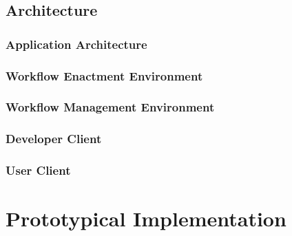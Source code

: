 \documentclass[language=english,noinputenc]{wiwwuwordrprt}
\begin{document}
    
    
    \section{Architecture} %
    \label{sec:architecture}
      \subsection{Application Architecture} %
      \label{sub:application_architecture}
      
      \subsection{Workflow Enactment Environment} %
      \label{sub:workflow_enactment_component}
      
      \subsection{Workflow Management Environment} %
      \label{sub:workflow_management}
      
      \subsection{Developer Client} %
      \label{sub:developer_client}
      

      \subsection{User Client} %
      \label{sub:user_client}
      
    
  

  \chapter{Prototypical Implementation} %
  \label{cha:implementation}
\end{document}
